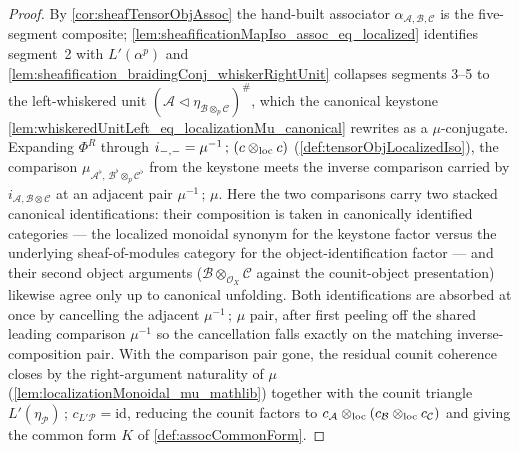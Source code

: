 \begin{proof}
  By \cref{cor:sheafTensorObjAssoc} the hand-built associator
  \(\alpha_{\mathcal{A},\mathcal{B},\mathcal{C}}\) is the five-segment composite;
  \cref{lem:sheafificationMapIso_assoc_eq_localized} identifies segment~2 with
  \(L'(\alpha^p)\) and
  \cref{lem:sheafification_braidingConj_whiskerRightUnit} collapses segments 3--5 to
  the left-whiskered unit \((\mathcal{A} \lhd \eta_{\mathcal{B}\otimes_p\mathcal{C}})^{\#}\),
  which the canonical keystone
  \cref{lem:whiskeredUnitLeft_eq_localizationMu_canonical} rewrites as a
  \(\mu\)-conjugate. Expanding \(\Phi^{R}\) through
  \(i_{-,-} = \mu^{-1}\,;\,(c \mathbin{\otimes_{\mathrm{loc}}} c)\) (\cref{def:tensorObjLocalizedIso}), the
  comparison \(\mu_{\mathcal{A}^{\flat},\,\mathcal{B}^{\flat}\otimes_p\mathcal{C}^{\flat}}\)
  from the keystone meets the inverse comparison carried by
  \(i_{\mathcal{A},\mathcal{B}\otimes\mathcal{C}}\) at an adjacent pair
  \(\mu^{-1}\,;\,\mu\). Here the two comparisons carry two stacked
  canonical identifications: their composition is taken in canonically identified
  categories --- the localized monoidal synonym for the
  keystone factor versus the underlying sheaf-of-modules category for the
  object-identification factor --- and their second object arguments
  (\(\mathcal{B}\otimes_{\mathcal{O}_X}\mathcal{C}\) against the counit-object
  presentation) likewise agree only up to canonical unfolding. Both identifications
  are absorbed at once by cancelling the adjacent \(\mu^{-1}\,;\,\mu\) pair, after
  first peeling off the shared leading comparison \(\mu^{-1}\) so the cancellation
  falls exactly on the matching inverse-composition pair. With the comparison pair
  gone, the residual counit coherence closes
  by the right-argument naturality of \(\mu\) (\cref{lem:localizationMonoidal_mu_mathlib}) together
  with the counit triangle \(L'(\eta_{\mathcal{P}})\,;\,c_{L'\mathcal{P}} =
  \mathrm{id}\), reducing the counit factors to
  \(c_{\mathcal{A}} \mathbin{\otimes_{\mathrm{loc}}} (c_{\mathcal{B}} \mathbin{\otimes_{\mathrm{loc}}} c_{\mathcal{C}})\) and giving
  the common form \(K\) of \cref{def:assocCommonForm}.
\end{proof}

